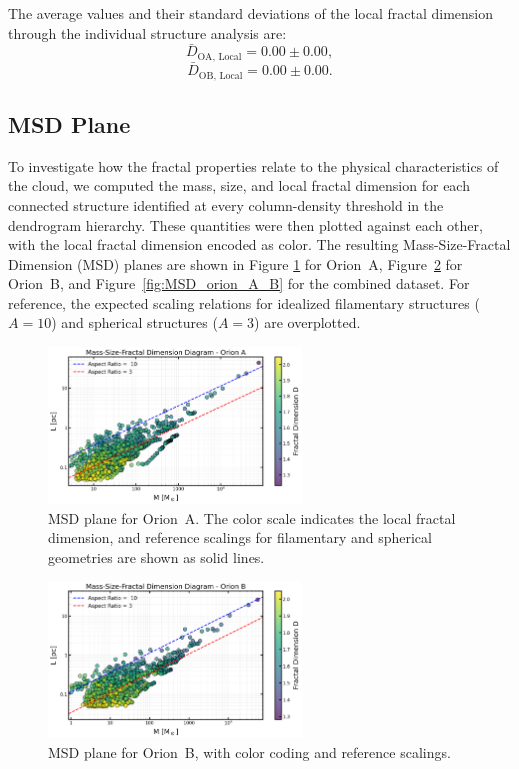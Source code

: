 The average values and their standard deviations of the local fractal dimension through the individual structure analysis are:
\[
\bar{D}_{\mathrm{OA,\,Local}} = 0.00 \pm 0.00,
\]
\[
\bar{D}_{\mathrm{OB,\,Local}} = 0.00 \pm 0.00.
\]

\subsection{MSD Plane}

To investigate how the fractal properties relate to the physical characteristics of the cloud, we computed the mass, size, and local fractal dimension for each connected structure identified at every column-density threshold in the dendrogram hierarchy.  
These quantities were then plotted against each other, with the local fractal dimension encoded as color.  
The resulting Mass-Size-Fractal Dimension (MSD) planes are shown in Figure \ref{fig:MSD_orion_A} for Orion~A, Figure~\ref{fig:MSD_orion_B} for Orion~B, and Figure~\ref{fig:MSD_orion_A_B} for the combined dataset.  
For reference, the expected scaling relations for idealized filamentary structures (\(A = 10\)) and spherical structures (\(A = 3\)) are overplotted.

\begin{figure}[t]
    \centering
    \includegraphics[width=0.6\textwidth]{figures/MSD_Orion_A.png}
    \caption{MSD plane for Orion~A. The color scale indicates the local fractal dimension, and reference scalings for filamentary and spherical geometries are shown as solid lines.}
    \label{fig:MSD_orion_A}
\end{figure}

\begin{figure}[t]
    \centering
    \includegraphics[width=0.6\textwidth]{figures/MSD_Orion_B.png}
    \caption{MSD plane for Orion~B, with color coding and reference scalings.}
    \label{fig:MSD_orion_B}
\end{figure}

